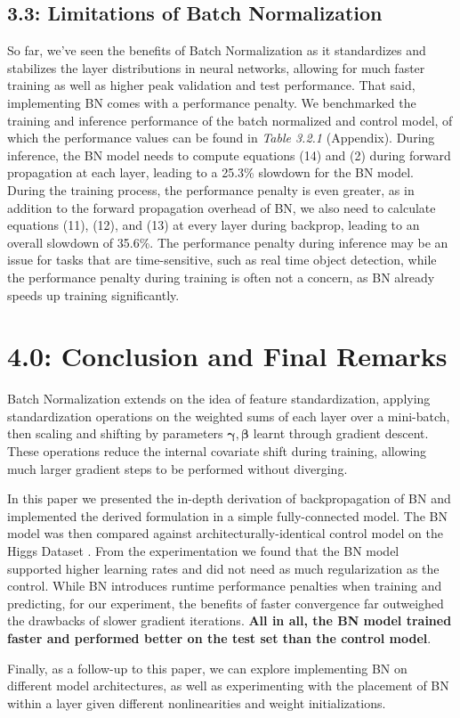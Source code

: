 \documentclass{article}
\begin{document}
\begin{multicols*}{2}
\subsection*{3.3: Limitations of Batch Normalization}

So far, we've seen the benefits of Batch Normalization as it standardizes and stabilizes the layer
distributions in neural networks, allowing for much faster training
as well as higher peak validation and test performance. That said, 
implementing BN comes with a performance penalty. We benchmarked the training
and inference performance of the batch normalized and control model, of which 
the performance values can be found in \textit{Table 3.2.1} (Appendix). During inference, 
the BN model needs to compute equations (14) and (2) during forward propagation
at each layer, leading to a 25.3\% slowdown for the BN model. During the training
process, the performance penalty is even greater, as in addition to the 
forward propagation overhead of BN, we also need to calculate equations (11), (12), and (13)
at every layer during backprop, leading to an overall slowdown of 35.6\%.
The performance penalty during inference may be an issue for tasks that 
are time-sensitive, such as real time object detection, while the performance
penalty during training is often not a concern, as BN already speeds up training
significantly.

\section*{4.0: Conclusion and Final Remarks}

Batch Normalization extends on the idea of feature standardization, applying 
standardization operations on the weighted sums of each layer over a mini-batch, 
then scaling and shifting by parameters $\boldsymbol{\gamma}, \boldsymbol{\beta}$ 
learnt through gradient descent. These operations reduce the internal covariate shift
during training, allowing much larger gradient steps to be performed without diverging.

In this paper we presented the in-depth derivation of backpropagation
of BN and implemented the derived formulation in a simple fully-connected model.
The BN model was then compared against architecturally-identical control model
on the Higgs Dataset \cite{higgs}. From the experimentation we found that the BN model supported
higher learning rates and did not need as much regularization as the control.
While BN introduces runtime performance penalties when training and predicting, 
for our experiment, the benefits of faster convergence far outweighed the 
drawbacks of slower gradient iterations.
\textbf{All in all, the BN model trained faster and performed better on the test set 
than the control model}.

Finally, as a follow-up to this paper, we can explore implementing BN on 
different model architectures, as well as experimenting with the placement 
of BN within a layer given different nonlinearities and weight initializations. 





\end{multicols*}
\end{document}

